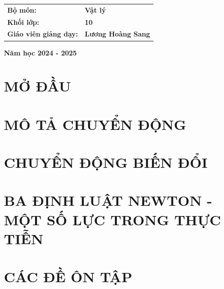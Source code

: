 \documentclass[twoside,12pt]{report}
\begin{document}
\begin{titlepage}
		\vspace{1cm}
		\begin{center}
			\fontsize{13pt}{17pt}\selectfont 
			\begin{tabular}{L{5cm}L{4.5cm}}
				\textbf{Bộ môn:}&\textbf{Vật lý}\\
				\textbf{Khối lớp:}&\textbf{10}\\
				\textbf{Giáo viên giảng dạy:}& \textbf{Lương Hoàng Sang}\\
			\end{tabular}
		\end{center}
		
		\vspace{4cm}
		
		\begin{center}
			\fontsize{13pt}{17pt}\selectfont 
			\textbf{Năm học 2024 - 2025}
		\end{center}
	\end{titlepage}
	\newpage
	\tableofcontents
	\cleardoublepage

%
\setcounter{part}{0}
\pagestyle{fancy}
\part{MỞ ĐẦU}

\newpage
\newpage
\part{MÔ TẢ CHUYỂN ĐỘNG}
\newpage
\newpage
\newpage
\part{CHUYỂN ĐỘNG BIẾN ĐỔI}
\newpage
\newpage
\part{BA ĐỊNH LUẬT NEWTON - MỘT SỐ LỰC TRONG THỰC TIỄN}
\newpage
\newpage
\newpage
\newpage
\setcounter{part}{-1}
\part{CÁC ĐỀ ÔN TẬP}
\newpage
\newpage
\newpage
\newpage
\newpage
\newpage
\newpage
\end{document}
